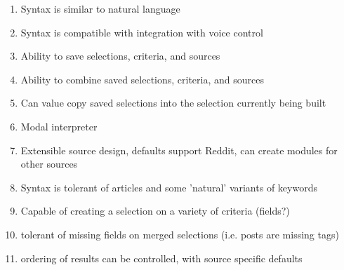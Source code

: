 \begin{enumerate}
\item Syntax is similar to natural language
\item Syntax is compatible with integration with voice control
\item Ability to save selections, criteria, and sources
\item Ability to combine saved selections, criteria, and sources
\item Can value copy saved selections into the selection currently being built
\item Modal interpreter
\item Extensible source design, defaults support Reddit, can create modules for other sources
\item Syntax is tolerant of articles and some 'natural' variants of keywords
\item Capable of creating a selection on a variety of criteria (fields?)
\item tolerant of missing fields on merged selections (i.e. posts are missing tags)
\item ordering of results can be controlled, with source specific defaults
\end{enumerate}

